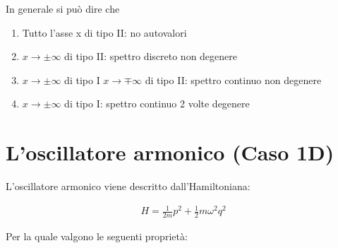 In generale si può dire che

\begin{enumerate}
	\item Tutto l'asse x di tipo II: no autovalori
	\item $x\rightarrow \pm \infty$ di tipo II: spettro discreto non degenere
	\item $x\rightarrow \pm \infty$ di tipo I $x\rightarrow \mp \infty$ di tipo II: spettro continuo non degenere
	\item $x\rightarrow \pm \infty$ di tipo I: spettro continuo 2 volte degenere
\end{enumerate}


\newpage
\section{L'oscillatore armonico (Caso 1D)}

L'oscillatore armonico viene descritto dall'Hamiltoniana:

\begin{align}
H = \frac{1}{2m} p^2  + \frac{1}{2} m \omega^2 q^2
\end{align}

Per la quale valgono le seguenti proprietà:

